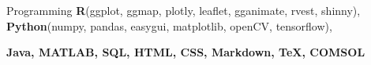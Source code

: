 

\begin{cvskills}



\cvskill
    {Programming} %
    {\textbf{R}(ggplot, ggmap, plotly, leaflet, gganimate, rvest, shinny), \textbf{Python}(numpy, pandas, easygui, matplotlib, openCV, tensorflow), } %
    

 \cvskill
  {} %
  {\textbf{Java, MATLAB, SQL, HTML, CSS, Markdown, \TeX, COMSOL}} %
    


    

\end{cvskills}
